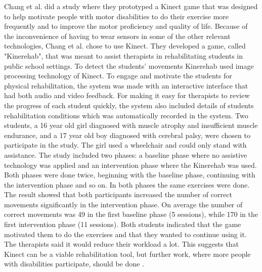 Chang et al. \cite{kinect} did a study where they prototyped a Kinect game that was designed to help motivate people with motor disabilities to do their exercise more frequently and to improve the motor proficiency and quality of life. Because of the inconvenience of having to wear sensors in some of the other relevant technologies, Chang et al. chose to use Kinect. They developed a game, called "Kinerehab", that was meant to assist therapists in rehabilitating students in public school settings. To detect the students’ movements Kinerehab used image processing technology of Kinect. To engage and motivate the students for physical rehabilitation, the system was made with an interactive interface that had both audio and video feedback. For making it easy for therapists to review the progress of each student quickly, the system also included details of students rehabilitation conditions which was automatically recorded in the system. Two students, a 16 year old girl diagnosed with  muscle atrophy and insufficient muscle endurance, and a 17 year old boy diagnosed with cerebral palsy, were chosen to participate in the study. The girl used a wheelchair and could only stand with assistance. The study included two phases: a baseline phase  where no assistive technology was applied and an intervention phase where the Kinerehab was used. Both phases were done twice, beginning with the baseline phase, continuing with the intervention phase and so on. In both phases the same exercises were done. The result showed that both participants increased the number of correct movements significantly in the intervention phase. On average the number of correct movements was 49 in the first baseline phase (5 sessions), while 170 in the first intervention phase (11 sessions). Both students indicated that the game motivated them to do the exercises and that they wanted to continue using it. The therapists said it would reduce their workload a lot. This suggests that Kinect can be a viable rehabilitation tool, but further work, where more people with disabilities participate, should be done \cite{kinect}. \\ \\ 
